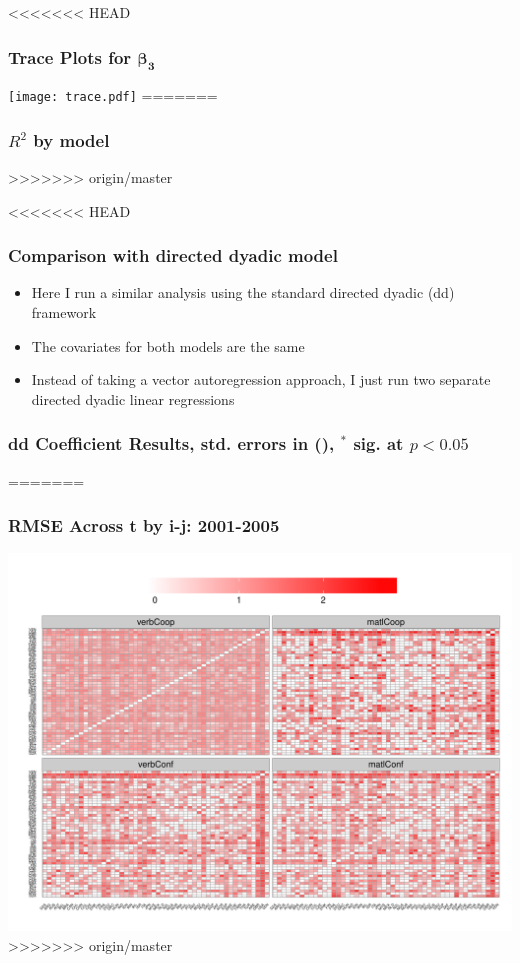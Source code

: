 \documentclass[10pt, compress]{beamer}
\begin{document}
\frame
{
<<<<<<< HEAD
\frametitle{Trace Plots for $\boldsymbol{\beta_{3}}$}
  \centering
  \texttt{[image: trace.pdf]}
=======
\frametitle{$R^{2}$ by model}
  \centering
  \vspace*{-.3in}
  
>>>>>>> origin/master
}

\frame
{
<<<<<<< HEAD
  \frametitle{Comparison with directed dyadic model}
  \begin{itemize}
  \item Here I run a similar analysis using the standard directed dyadic (dd) framework
  \item The covariates for both models are the same 
  \item Instead of taking a vector autoregression approach, I just run two separate directed dyadic linear regressions
  \end{itemize}
} 

\frame
{
  \frametitle{dd Coefficient Results, std. errors in (), $^*$ sig. at $p< 0.05 $ }
  \vspace{-.3in}
  \tiny{}
=======
\frametitle{RMSE Across t by i-j: 2001-2005}
  \centering
  \vspace*{-.3in}
  \includegraphics[width=1\textwidth]{2001-2005_iperf.pdf}
>>>>>>> origin/master
}
\end{document}
